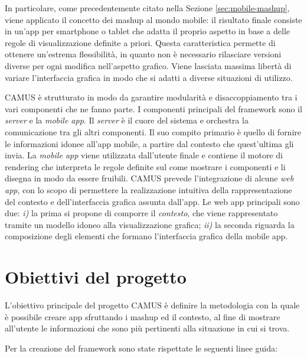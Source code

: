 In particolare, come precedentemente citato nella Sezione \ref{sec:mobile-mashup}, viene applicato il concetto dei mashup al mondo mobile: il risultato finale consiste in un'app per smartphone o tablet che adatta il proprio aspetto in base a delle regole di visualizzazione definite a priori. Questa caratteristica permette di ottenere un'estrema flessibilità, in quanto non è necessario rilasciare versioni diverse per ogni modifica nell'aspetto grafico. Viene lasciata massima libertà di variare l'interfaccia grafica in modo che si adatti a diverse situazioni di utilizzo.

CAMUS è strutturato in modo da garantire modularità e disaccoppiamento tra i vari componenti che ne fanno parte. I componenti principali del framework sono il \emph{server} e la \emph{mobile app}. Il \emph{server} è il cuore del sistema e orchestra la comunicazione tra gli altri componenti. Il suo compito primario è quello di fornire le informazioni idonee all'app mobile, a partire dal contesto che quest'ultima gli invia. La \emph{mobile app} viene utilizzata dall'utente finale e contiene il motore di rendering che interpreta le regole definite sul come mostrare i componenti e li disegna in modo da essere fruibili.
CAMUS prevede l'integrazione di alcune \emph{web app}, con lo scopo di permettere la realizzazione intuitiva della rappresentazione del contesto e dell'interfaccia grafica assunta dall'app. Le web app principali sono due: \emph{i)} la prima si propone di comporre il \emph{contesto}, che viene rappresentato tramite un modello idoneo alla visualizzazione grafica; \emph{ii)} la seconda riguarda la composizione degli elementi che formano l'interfaccia grafica della mobile app.

\section{Obiettivi del progetto\label{sec:obiettivi-progetto}}

L'obiettivo principale del progetto CAMUS è definire la metodologia con la quale è possibile creare app sfruttando i mashup ed il contesto, al fine di mostrare all'utente le informazioni che sono più pertinenti alla situazione in cui si trova.

Per la creazione del framework sono state rispettate le seguenti linee guida:

